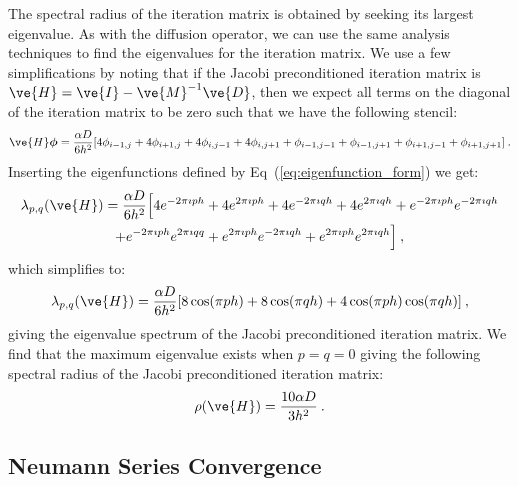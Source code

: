 \documentclass[preprint,11pt]{elsarticle}
\begin{document}
The spectral radius of the iteration matrix is obtained by seeking its largest
eigenvalue. As with the diffusion operator, we can use the same analysis
techniques to find the eigenvalues for the iteration matrix. We use a few
simplifications by noting that if the Jacobi preconditioned iteration matrix
is $\ve{H} = \ve{I} - \ve{M}^{-1}\ve{D}$, then we expect all terms on the
diagonal of the iteration matrix to be zero such that we have the following
stencil:
\begin{equation}
  \ve{H}\boldsymbol{\phi} = \frac{\alpha D}{6h^2}[4 \phi_{i-1,j}
    + 4 \phi_{i+1,j} + 4 \phi_{i,j-1} + 4 \phi_{i,j+1} +
    \phi_{i-1,j-1} + \phi_{i-1,j+1} + \phi_{i+1,j-1} +
    \phi_{i+1,j+1}]\:.
  \label{eq:iteration_stencil}
\end{equation}
Inserting the eigenfunctions defined by Eq~(\ref{eq:eigenfunction_form}) we
get:
\begin{multline}
  \lambda_{p,q}(\ve{H}) = \frac{\alpha D}{6h^2}\Big[4 e^{-2 \pi \imath p
      h} + 4 e^{2 \pi \imath p h} + 4 e^{-2 \pi \imath q h} + 4 e^{2
      \pi \imath q h} + e^{-2 \pi \imath p h} e^{-2 \pi \imath q h}
    \\ + e^{-2 \pi \imath p h} e^{2 \pi \imath q q} + e^{2 \pi \imath
      p h} e^{-2 \pi \imath q h} + e^{2 \pi \imath p h} e^{2 \pi
      \imath q h}\Big]\:,
  \label{eq:iteration_deriv}
\end{multline}
which simplifies to:
\begin{equation}
  \lambda_{p,q}(\ve{H}) = \frac{\alpha D}{6h^2}[ 8 \cos(\pi p h) + 8
    \cos(\pi q h) + 4 \cos(\pi p h) \cos(\pi q h)]\:,
  \label{eq:iteration_spectrum}
\end{equation}
giving the eigenvalue spectrum of the Jacobi preconditioned iteration
matrix. We find that the maximum eigenvalue exists when $p=q=0$ giving the
following spectral radius of the Jacobi preconditioned iteration matrix:
\begin{equation}
  \rho(\ve{H}) = \frac{10 \alpha D}{3 h^2}\:.
  \label{eq:iteration_radius}
\end{equation}

\subsection{Neumann Series Convergence}
\label{subsec:neumann_convergence}
\end{document}
